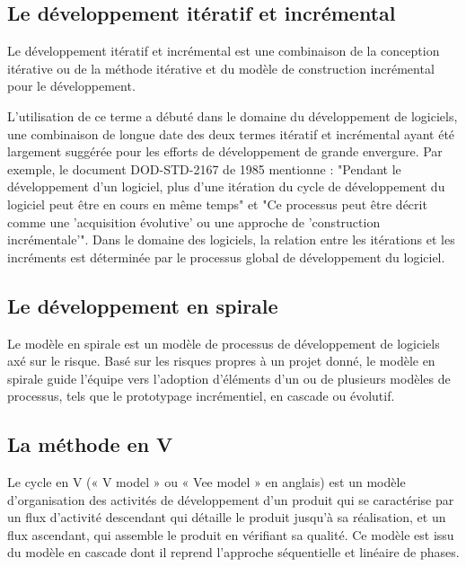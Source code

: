 \subsection{Le développement itératif et incrémental}\label{subsec:developpement-iteratif-et-incremental}
Le développement itératif et incrémental\cite{iterative_incremental_development} est une combinaison de la conception itérative ou de la méthode
itérative et du modèle de construction incrémental pour le développement.

L'utilisation de ce terme a débuté dans le domaine du développement de logiciels, une combinaison de
longue date des deux termes itératif et incrémental ayant été largement suggérée pour les efforts de
développement de grande envergure. Par exemple, le document DOD-STD-2167 de 1985 mentionne :
"Pendant le développement d'un logiciel, plus d'une itération du cycle de développement du logiciel
peut être en cours en même temps" et "Ce processus peut être décrit comme une 'acquisition évolutive'
ou une approche de 'construction incrémentale'". Dans le domaine des logiciels, la relation entre les
itérations et les incréments est déterminée par le processus global de développement du logiciel.

\subsection{Le développement en spirale}\label{subsec:developpement-en-spirale}

Le modèle en spirale est un modèle de processus de développement de logiciels axé sur le risque.
Basé sur les risques propres à un projet donné, le modèle en spirale guide l'équipe vers
l'adoption d'éléments d'un ou de plusieurs modèles de processus, tels que le prototypage incrémentiel,
en cascade ou évolutif.

\subsection{La méthode en V}\label{subsec:methode-en-v}
Le cycle en V (« V model » ou « Vee model » en anglais) est un modèle d'organisation des
activités de développement d'un produit qui se caractérise par un flux d'activité descendant
qui détaille le produit jusqu'à sa réalisation, et un flux ascendant, qui assemble le produit
en vérifiant sa qualité. Ce modèle est issu du modèle en cascade dont il reprend l'approche
séquentielle et linéaire de phases.

